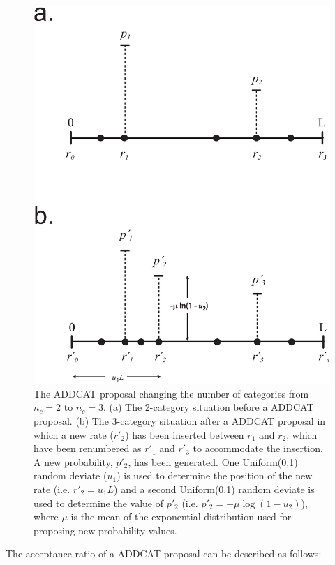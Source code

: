 \documentclass[12pt]{article}
\newcommand{\ncat}{n_c}
\newcommand{\newprobmean}{\mu}
\begin{document}
%
%
\begin{figure}
\centering
\hfil\includegraphics[scale=0.7]{addcat.eps}\hfil
\caption{The ADDCAT proposal changing the number of categories from $\ncat = 2$ to $\ncat = 3$. (a) The 2-category situation before a ADDCAT proposal. (b) The 3-category situation after a ADDCAT proposal in which a new rate ($r'_2$) has been inserted between $r_1$ and $r_2$, which have been renumbered as $r'_1$ and $r'_3$ to accommodate the insertion. A new probability, $p'_2$, has been generated. One Uniform(0,1) random deviate ($u_1$) is used to determine the position of the new rate (i.e. $r'_2 = u_1 L$) and a second Uniform(0,1) random deviate is used to determine the value of $p'_2$ (i.e. $p'_2 = -\newprobmean \log(1 - u_2)$), where $\newprobmean$ is the mean of the exponential distribution used for proposing new probability values.}
\label{addcat}
\end{figure}

The acceptance ratio of a ADDCAT proposal can be described as follows:
\end{document}
